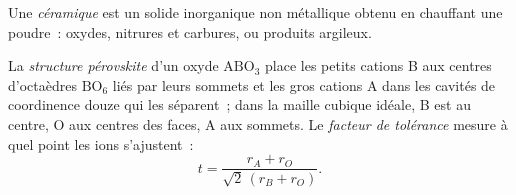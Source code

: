 \begin{definition}[Céramique]\label{def:b3:inorganic-materials:ceramic}
Une \emph{céramique} est un solide inorganique non métallique
obtenu en chauffant une poudre~: oxydes, nitrures et carbures, ou produits
argileux.
\end{definition}

\begin{definition}\label{def:b3:inorganic-materials:perovskite}
La \emph{structure pérovskite} d'un oxyde $\mathrm{ABO_3}$
place les petits cations B aux centres d'octaèdres $\mathrm{BO_6}$ liés par leurs sommets et
les gros cations A dans les cavités de coordinence douze qui les séparent~;
dans la maille cubique idéale, B est au centre, O aux centres des faces, A
aux sommets. Le \emph{facteur de tolérance} mesure à quel point
les ions s'ajustent~:
\[
  t = \frac{r_A + r_O}{\sqrt2\,(r_B + r_O)}.
\]
\end{definition}

